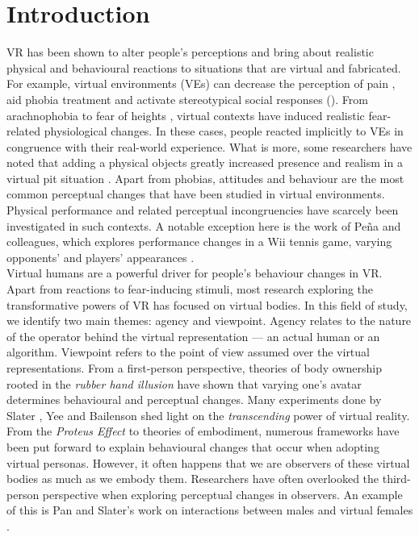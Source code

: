 \section{Introduction}
\label{section:intro}
VR has been shown to alter people's perceptions and bring about realistic physical and behavioural reactions to situations that are virtual and fabricated. For example, virtual environments (VEs) can decrease the perception of pain \cite{muhlberger2007pain}, aid phobia treatment \cite{parsons2008affective} and activate stereotypical social responses (\cite{dotsch2008virtual}). From arachnophobia \cite{garcia2002virtual} to fear of heights \cite{meehan2002physiological}, virtual contexts have induced realistic fear-related physiological changes. In these cases, people reacted implicitly to VEs in congruence with their real-world experience. What is more, some researchers have noted that adding a physical objects greatly increased presence and realism in a virtual pit situation \cite{meehan2002physiological}. Apart from phobias, attitudes and behaviour are the most common perceptual changes that have been studied in virtual environments. Physical performance and related perceptual incongruencies have scarcely been investigated in such contexts. A notable exception here is the work of Peña and colleagues, which explores performance changes in a Wii tennis game, varying opponents' and players' appearances \cite{pena2016see}.
\\
Virtual humans are a powerful driver for people's behaviour changes in VR. Apart from reactions to fear-inducing stimuli, most research exploring the transformative powers of VR has focused on virtual bodies. In this field of study, we identify two main themes: agency and viewpoint. Agency relates to the nature of the operator behind the virtual representation --- an actual human or an algorithm. Viewpoint refers to the point of view assumed over the virtual representations. From a first-person perspective, theories of body ownership rooted in the \textit{rubber hand illusion} \cite{botvinick1998rubber} have shown that varying one's avatar determines behavioural and perceptual changes. Many experiments done by Slater \cite{slater2014transcending,slater2006virtual}, Yee and Bailenson \cite{yee2009proteus} shed light on the \textit{transcending} power of virtual reality.  From the \textit{Proteus Effect} to theories of embodiment, numerous frameworks have been put forward to explain behavioural changes that occur when adopting virtual personas. However, it often happens that we are observers of these virtual bodies as much as we embody them.  Researchers have often overlooked the third-person perspective when exploring perceptual changes in observers. An example of this is Pan and Slater's work on interactions between males and virtual females \cite{pan2007preliminary}.
